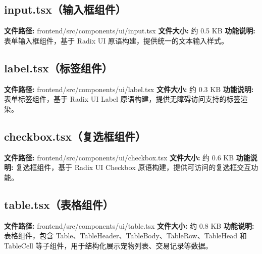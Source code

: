 \documentclass[code]{mancls}
\begin{document}


\pagebreak

\subsection{input.tsx（输入框组件）}
\textbf{文件路径:} frontend/src/components/ui/input.tsx
\textbf{文件大小:} 约 0.5 KB
\textbf{功能说明:} 表单输入框组件，基于 Radix UI 原语构建，提供统一的文本输入样式。



\pagebreak

\subsection{label.tsx（标签组件）}
\textbf{文件路径:} frontend/src/components/ui/label.tsx
\textbf{文件大小:} 约 0.3 KB
\textbf{功能说明:} 表单标签组件，基于 Radix UI Label 原语构建，提供无障碍访问支持的标签渲染。



\pagebreak

\subsection{checkbox.tsx（复选框组件）}
\textbf{文件路径:} frontend/src/components/ui/checkbox.tsx
\textbf{文件大小:} 约 0.6 KB
\textbf{功能说明:} 复选框组件，基于 Radix UI Checkbox 原语构建，提供可访问的复选框交互功能。



\pagebreak

\subsection{table.tsx（表格组件）}
\textbf{文件路径:} frontend/src/components/ui/table.tsx
\textbf{文件大小:} 约 0.8 KB
\textbf{功能说明:} 表格组件，包含 Table、TableHeader、TableBody、TableRow、TableHead 和 TableCell 等子组件，用于结构化展示宠物列表、交易记录等数据。


\end{document}
